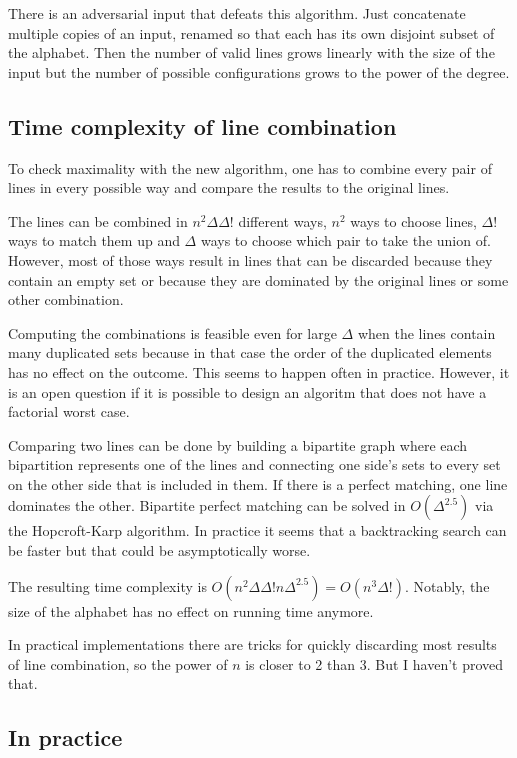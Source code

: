\documentclass[english, 12pt, a4paper, sci, a-1b, online]{aaltothesis}
\begin{document}
There is an adversarial input that defeats this algorithm. Just concatenate multiple copies of an input, renamed so that each has its own disjoint subset of the alphabet. Then the number of valid lines grows linearly with the size of the input but the number of possible configurations grows to the power of the degree.

\subsection{Time complexity of line combination}

To check maximality with the new algorithm, one has to combine every pair of lines in every possible way and compare the results to the original lines.

The lines can be combined in $n^2\Delta\Delta!$ different ways, $n^2$ ways to choose lines, $\Delta!$ ways to match them up and $\Delta$ ways to choose which pair to take the union of. However, most of those ways result in lines that can be discarded because they contain an empty set or because they are dominated by the original lines or some other combination.

Computing the combinations is feasible even for large $\Delta$ when the lines contain many duplicated sets because in that case the order of the duplicated elements has no effect on the outcome. This seems to happen often in practice. However, it is an open question if it is possible to design an algoritm that does not have a factorial worst case.

Comparing two lines can be done by building a bipartite graph where each bipartition represents one of the lines and connecting one side's sets to every set on the other side that is included in them. If there is a perfect matching, one line dominates the other. Bipartite perfect matching can be solved in $O(\Delta^{2.5})$ via the Hopcroft-Karp algorithm. In practice it seems that a backtracking search can be faster but that could be asymptotically worse.

The resulting time complexity is $O(n^2\Delta\Delta!n\Delta^{2.5}) = O(n^3\Delta!)$. Notably, the size of the alphabet has no effect on running time anymore.

In practical implementations there are tricks for quickly discarding most results of line combination, so the power of $n$ is closer to 2 than 3. But I haven't proved that.

\subsection{In practice}
\end{document}
